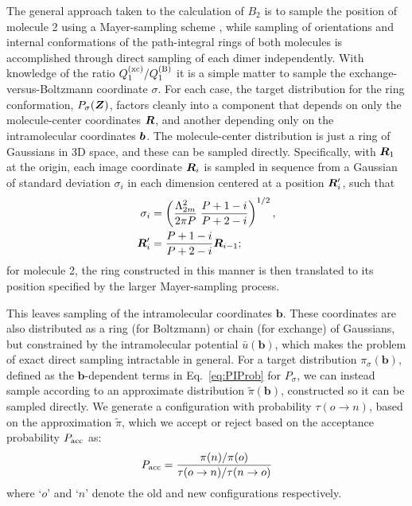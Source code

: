         \noindent The general approach taken to the calculation of $B_2$ is to sample the position of molecule 2 using a Mayer-sampling scheme \cite{Singh2004}, while sampling of orientations and internal conformations of the path-integral rings of both molecules is accomplished through direct sampling of each dimer independently. With knowledge of the ratio $Q_1^{\rm (xc)}/Q_1^{\rm (B)}$ it is a simple matter to sample the exchange-versus-Boltzmann coordinate $\sigma$. For each case, the target distribution for the ring conformation, $P_\sigma({\boldsymbol {Z}})$, factors cleanly into a component that depends on only the molecule-center coordinates ${\boldsymbol {R}}$, and another depending only on the intramolecular coordinates ${\boldsymbol {b}}$. The molecule-center distribution is just a ring of Gaussians in 3D space, and these can be sampled directly. Specifically, with ${\boldsymbol {R}}_1$ at the origin, each image coordinate ${\boldsymbol {R}}_i$ is sampled in sequence from a Gaussian of standard deviation $\sigma_i$ in each dimension centered at a position ${\boldsymbol {R}}_i'$, such that \cite{Shaul2012}
        \begin{equation}
            \begin{aligned}
                \sigma _i &= \left( \frac{\Lambda _{2m}^2}{2\pi P}\;\frac{P + 1 - i}{P + 2 - i} \right)^{1/2},\\
                {\boldsymbol {R}}_i'  &= \frac{P + 1 - i}{P + 2 - i}{{\boldsymbol {R}}_{i - 1}};
            \end{aligned}
        \end{equation}
        for molecule 2, the ring constructed in this manner is then translated to its position specified by the larger Mayer-sampling process.

        This leaves sampling of the intramolecular coordinates ${\mathbf b}$. These coordinates are also distributed as a ring (for Boltzmann) or chain (for exchange) of Gaussians, but constrained by the intramolecular potential $\bar u({\mathbf b})$, which makes the problem of exact direct sampling intractable in general. For a target distribution $\pi_\sigma({\mathbf b})$, defined as the ${\mathbf b}$-dependent terms in Eq.~\ref{eq:PIProb} for $P_\sigma$, we can instead sample according to an approximate distribution $\tilde \pi({\mathbf b})$, constructed so it can be sampled directly. We generate a configuration with probability $\tau (o \to n)$, based on the approximation $\tilde \pi$, which we accept or reject based on the acceptance probability $P_{\rm acc}$ as:
        \begin{equation}
            \label{eq:Pacc}
            P_{\rm acc} = \frac{\pi(n)/\pi(o)}{\tau (o \to n)/\tau (n \to o)}
        \end{equation}
        where `$o$' and `$n$' denote the old and new configurations respectively.

